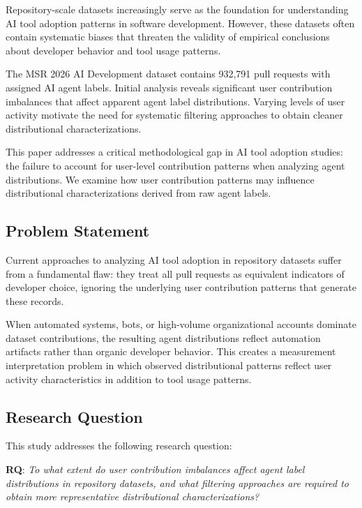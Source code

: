 \documentclass[conference]{IEEEtran}
\begin{document}
Repository-scale datasets increasingly serve as the foundation for understanding AI tool adoption patterns in software development. However, these datasets often contain systematic biases that threaten the validity of empirical conclusions about developer behavior and tool usage patterns.

The MSR 2026 AI Development dataset contains 932,791 pull requests with assigned AI agent labels. Initial analysis reveals significant user contribution imbalances that affect apparent agent label distributions. Varying levels of user activity motivate the need for systematic filtering approaches to obtain cleaner distributional characterizations.

This paper addresses a critical methodological gap in AI tool adoption studies: the failure to account for user-level contribution patterns when analyzing agent distributions. We examine how user contribution patterns may influence distributional characterizations derived from raw agent labels.

\subsection{Problem Statement}

Current approaches to analyzing AI tool adoption in repository datasets suffer from a fundamental flaw: they treat all pull requests as equivalent indicators of developer choice, ignoring the underlying user contribution patterns that generate these records.

When automated systems, bots, or high-volume organizational accounts dominate dataset contributions, the resulting agent distributions reflect automation artifacts rather than organic developer behavior. This creates a measurement interpretation problem in which observed distributional patterns reflect user activity characteristics in addition to tool usage patterns.

\subsection{Research Question}

This study addresses the following research question:

\textbf{RQ}: \textit{To what extent do user contribution imbalances affect agent label distributions in repository datasets, and what filtering approaches are required to obtain more representative distributional characterizations?}
\end{document}
